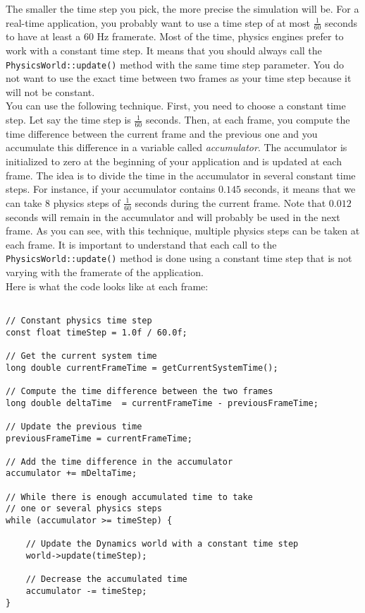 \documentclass[a4paper,12pt]{article}
\begin{document}
    The smaller the time step you pick, the more precise the simulation will be. For a real-time application, you probably want to use a time step of
    at most $\frac{1}{60}$ seconds to have at least a 60 Hz framerate. Most of the time, physics engines prefer to work with a constant time step.
    It means that you should always call the \texttt{PhysicsWorld::update()} method with the same time step parameter. You do not want to use the exact time
    between two frames as your time step because it will not be constant. \\

    You can use the following technique. First, you need to choose a constant time step. Let say the time step is $\frac{1}{60}$ seconds.
    Then, at each frame, you compute the time difference between the current frame and the previous one and you accumulate this difference in a variable
    called \emph{accumulator}. The accumulator is initialized to zero at the beginning of your application and is updated at each frame. The idea is to
    divide the time in the accumulator in several constant time steps.  For instance, if your accumulator contains $0.145$ seconds, it means that
    we can take $8$ physics steps of $\frac{1}{60}$ seconds during the current frame. Note that $0.012$ seconds will remain in the accumulator
    and will probably be used in the next frame. As you can see, with this technique, multiple physics steps can be taken at each frame.
    It is important to understand that each call to the \texttt{PhysicsWorld::update()} method is done using a constant time step that is
    not varying with the framerate of the application. \\

    Here is what the code looks like at each frame: \\

    \begin{lstlisting}

// Constant physics time step
const float timeStep = 1.0f / 60.0f;

// Get the current system time
long double currentFrameTime = getCurrentSystemTime();

// Compute the time difference between the two frames
long double deltaTime  = currentFrameTime - previousFrameTime;

// Update the previous time
previousFrameTime = currentFrameTime;

// Add the time difference in the accumulator
accumulator += mDeltaTime;

// While there is enough accumulated time to take
// one or several physics steps
while (accumulator >= timeStep) {

    // Update the Dynamics world with a constant time step
    world->update(timeStep);

    // Decrease the accumulated time
    accumulator -= timeStep;
}

    \end{lstlisting}
\end{document}
